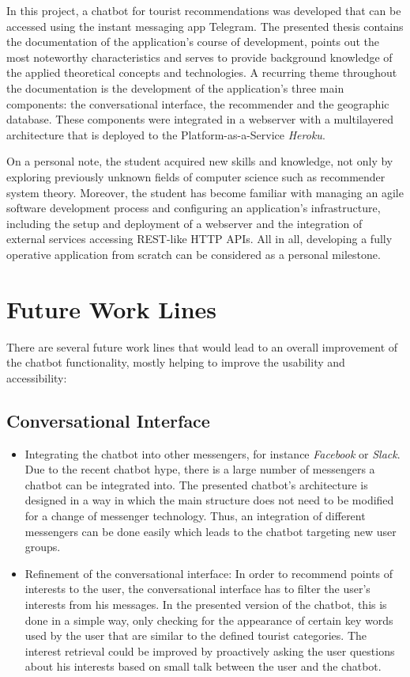 
In this project, a chatbot for tourist recommendations was developed that can be accessed using the instant messaging app Telegram. The presented thesis contains the documentation of the application’s course of development, points out the most noteworthy characteristics and serves to provide background knowledge of the applied theoretical concepts and technologies. A recurring theme throughout the documentation is the development of the application’s three main components: the conversational interface, the recommender and the geographic database. These components were integrated in a webserver with a multilayered architecture that is deployed to the Platform-as-a-Service \textit{Heroku}.

On a personal note, the student acquired new skills and knowledge, not only by exploring previously unknown fields of computer science such as recommender system theory. Moreover, the student has become familiar with managing an agile software development process and configuring an application’s infrastructure, including the setup and deployment of a webserver and the integration of external services accessing REST-like HTTP APIs. All in all, developing a fully operative application from scratch can be considered as a personal milestone. 

\section{Future Work Lines}
There are several future work lines that would lead to an overall improvement of the chatbot functionality, mostly helping to improve the usability and accessibility:

\subsection{Conversational Interface}
\begin{itemize}
\item Integrating the chatbot into other messengers, for instance \textit{Facebook} or \textit{Slack}. Due to the recent chatbot hype, there is a large number of messengers a chatbot can be integrated into. The presented chatbot’s architecture is designed in a way in which the main structure does not need to be modified for a change of messenger technology. Thus, an integration of different messengers can be done easily which leads to the chatbot targeting new user groups.

\item Refinement of the conversational interface: In order to recommend points of interests to the user, the conversational interface has to filter the user’s interests from his messages. In the presented version of the chatbot, this is done in a simple way, only checking for the appearance of certain key words used by the user that are similar to the defined tourist categories. The interest retrieval could be improved by proactively asking the user questions about his interests based on small talk between the user and the chatbot.
\end{itemize}

